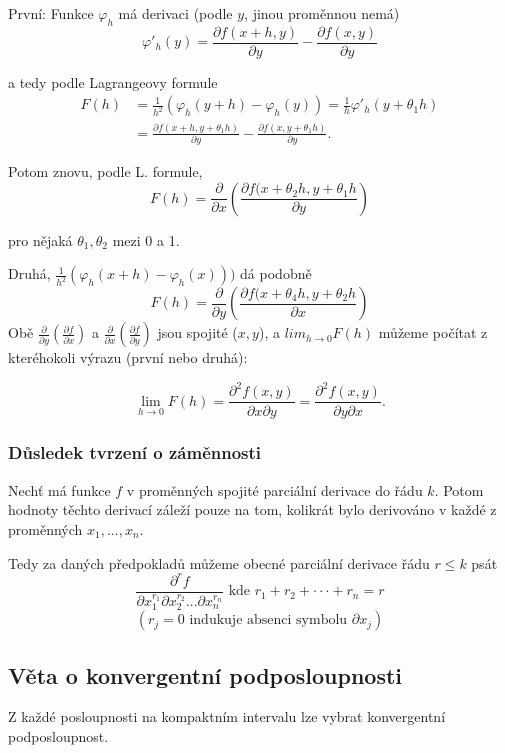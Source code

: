 \documentclass[10pt]{article}
\begin{document}
První: Funkce $\varphi_h$ má derivaci (podle $y$, jinou proměnnou nemá)
\[\varphi'_h(y)=\frac{\partial f(x+h,y)}{\partial y}-\frac{\partial f(x,y)}{\partial y}\]

a tedy podle Lagrangeovy formule
\begin{align*}
    F(h) & = \frac{1}{h^2}(\varphi_h(y+h)-\varphi_h(y)) = \frac{1}{h}\varphi'_h(y+\theta_1h)\\
    & = \frac{\partial f(x+h,y+\theta_1h)}{\partial y} -\frac{\partial f(x,y+\theta_1h)}{\partial y}.
\end{align*}

Potom znovu, podle L. formule,
\[F(h) = \frac{\partial }{\partial x}\left(\frac{\partial f(x+\theta_2h,y+\theta_1h}{\partial y}\right)\]

pro nějaká $\theta_1,\theta_2$ mezi 0 a 1.

Druhá, $\frac{1}{h^2}(\varphi_h(x+h) - \varphi_h(x)))$ dá podobně
\[F(h) = \frac{\partial }{\partial y}\left(\frac{\partial f(x+\theta_4h,y + \theta_2h}{\partial x}\right)\]
Obě $\frac{\partial }{\partial y}(\frac{\partial f}{\partial x})$ a $\frac{\partial }{\partial x}(\frac{\partial f}{\partial y})$ jsou spojité ($x,y$), a $lim_{h\rightarrow 0} F(h)$ můžeme počítat z kteréhokoli výrazu (první nebo druhá):

\[\lim_{h\rightarrow 0}F(h) = \frac{\partial ^2 f(x,y)}{\partial x \partial y} 
                            = \frac{\partial ^2 f(x,y)}{\partial y \partial x}.\]
\subsubsection{Důsledek tvrzení o záměnnosti}
\hspace{1.2mm}
Nechť má funkce $f$ v proměnných spojité parciální derivace do řádu $k$. Potom hodnoty těchto derivací
záleží pouze na tom, kolikrát bylo derivováno v každé z proměnných $x_1, ... , x_n$.

\noindent
\hspace{1.2mm}
Tedy za daných předpokladů můžeme obecné parciální derivace řádu $r \leq k$ psát
\[\frac{\partial ^r f}{\partial x^{r_1}_1 \partial x^{r_2}_2 ... \partial x_n^{r_n}} \text{ kde } r_1 + r_2 + \cdot \cdot \cdot + r_n = r \]
\[(r_j = 0 \text{ indukuje absenci symbolu } \partial x_j)\]

\subsection{Věta o konvergentní podposloupnosti}
\hspace{1.2mm}
\noindent
Z každé posloupnosti na kompaktním intervalu lze vybrat konvergentní podposloupnost.
\end{document}
